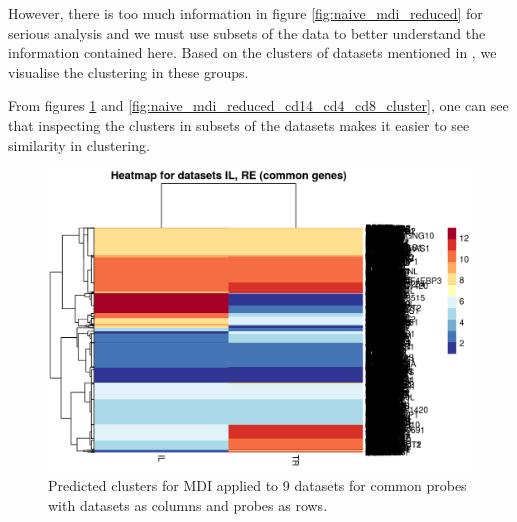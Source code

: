 \documentclass[12pt]{article} %
\begin{document}
	However, there is too much information in figure \ref{fig:naive_mdi_reduced} for serious analysis and we must use subsets of the data to better understand the information contained here. Based on the clusters of datasets mentioned in \label{list:datasets_naive_mdi_reduced}, we visualise the clustering in these groups.
	
	From figures \ref{fig:naive_mdi_reduced_il_tr_cluster} and \ref{fig:naive_mdi_reduced_cd14_cd4_cd8_cluster}, one can see that inspecting the clusters in subsets of the datasets makes it easier to see similarity in clustering.
	
	

	\begin{figure}[h]
		\includegraphics[scale=1.0]{Images/Initial_analysis/sim_heatmaps-2.png}
		\caption{Predicted clusters for MDI applied to 9 datasets for common probes with datasets as columns and probes as rows.}
		\label{fig:naive_mdi_reduced_il_tr_cluster}
	\end{figure}
	
\end{document}
